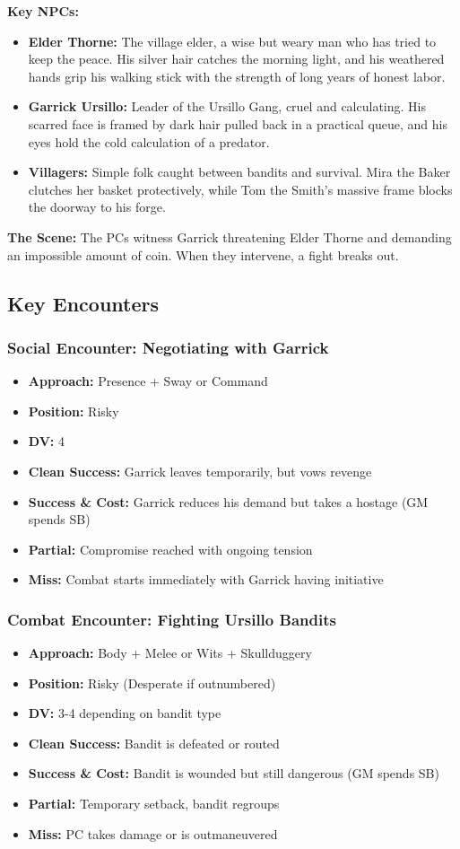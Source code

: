 \documentclass[11pt]{article}
\newenvironment{encounterbox}[1]{%
  \begin{mdframed}[backgroundcolor=encountercolor!30, linewidth=1pt, linecolor=accentcolor]%
  \subsubsection*{#1}%
}{%
  \end{mdframed}%
}
\begin{document}
\textbf{Key NPCs:}
\begin{itemize}
\item \textbf{Elder Thorne:} The village elder, a wise but weary man who has tried to keep the peace. His silver hair catches the morning light, and his weathered hands grip his walking stick with the strength of long years of honest labor.
\item \textbf{Garrick Ursillo:} Leader of the Ursillo Gang, cruel and calculating. His scarred face is framed by dark hair pulled back in a practical queue, and his eyes hold the cold calculation of a predator.
\item \textbf{Villagers:} Simple folk caught between bandits and survival. Mira the Baker clutches her basket protectively, while Tom the Smith's massive frame blocks the doorway to his forge.
\end{itemize}

\textbf{The Scene:} The PCs witness Garrick threatening Elder Thorne and demanding an impossible amount of coin. When they intervene, a fight breaks out.

\subsection{Key Encounters}

\begin{encounterbox}{Social Encounter: Negotiating with Garrick}
\begin{itemize}
\item \textbf{Approach:} Presence + Sway or Command
\item \textbf{Position:} Risky
\item \textbf{DV:} 4
\item \textbf{Clean Success:} Garrick leaves temporarily, but vows revenge
\item \textbf{Success \& Cost:} Garrick reduces his demand but takes a hostage (GM spends SB)
\item \textbf{Partial:} Compromise reached with ongoing tension
\item \textbf{Miss:} Combat starts immediately with Garrick having initiative
\end{itemize}
\end{encounterbox}

\begin{encounterbox}{Combat Encounter: Fighting Ursillo Bandits}
\begin{itemize}
\item \textbf{Approach:} Body + Melee or Wits + Skullduggery
\item \textbf{Position:} Risky (Desperate if outnumbered)
\item \textbf{DV:} 3-4 depending on bandit type
\item \textbf{Clean Success:} Bandit is defeated or routed
\item \textbf{Success \& Cost:} Bandit is wounded but still dangerous (GM spends SB)
\item \textbf{Partial:} Temporary setback, bandit regroups
\item \textbf{Miss:} PC takes damage or is outmaneuvered
\end{itemize}
\end{encounterbox}
\end{document}
